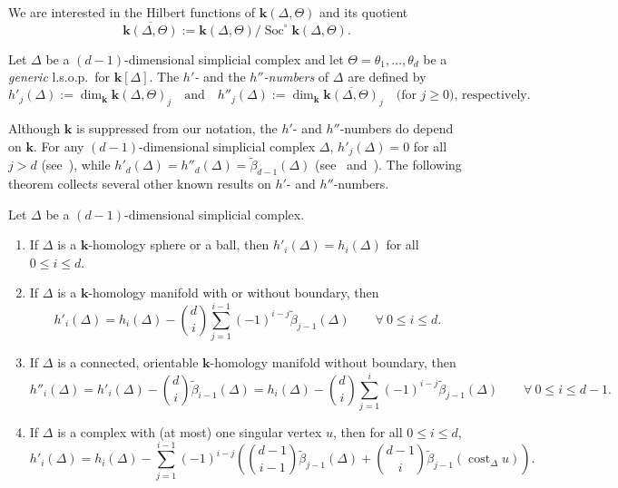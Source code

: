 \documentclass[ALCO,ThmDefs,Unicode,epreuves]{cedram}
\DeclareMathOperator\cost{cost}
\DeclareMathOperator{\Soc}{Soc}
\newcommand{\field}{\mathbf{k}}
\begin{document}
We are interested in the Hilbert functions of $\field(\Delta,\Theta)$ and its quotient \[\overline{\field(\Delta,\Theta)}:= \field(\Delta,\Theta)/\Soc^\circ \field(\Delta,\Theta).\] 
\begin{defi} \label{def-h'-h''}
Let $\Delta$ be a $(d-1)$-dimensional simplicial complex and let $\Theta=\theta_1,\ldots,\theta_d$ be a \emph{generic} l.s.o.p.~for $\field[\Delta]$. The \emph{$h'$-} and the \emph{$h''$-numbers} of $\Delta$ are defined by
\[
h'_j(\Delta):=\dim_\field \field(\Delta,\Theta)_j \quad \mbox{and} \quad h''_j(\Delta):=\dim_\field \overline{\field(\Delta,\Theta)}_j \quad \mbox{(for $j\geq 0$), respectively.}
\]
\end{defi} 

Although $\field$ is suppressed from our notation, the $h'$- and $h''$-numbers do depend on $\field$. For any $(d-1)$-dimensional simplicial complex $\Delta$, $h'_j(\Delta)=0$ for all $j>d$ (see~\cite[Proposition~III.2.4(b)]{Stanley-96}), while $h'_d(\Delta)=h''_d(\Delta)=\tilde{\beta}_{d-1}(\Delta)$ (see~\cite[Theorem~4.1]{TayWhiteley} and~\cite[Lemma~2.2(3)]{Babson-Novik}). The following theorem collects several other known results on $h'$- and $h''$-numbers.

\goodbreak
\begin{theorem} \label{known-h'-h''} Let $\Delta$ be a $(d-1)$-dimensional simplicial complex.
\begin{enumerate}
\item\label{theo2.2_1} If $\Delta$ is a $\field$-homology sphere or a ball, then $h'_i(\Delta)=h_i(\Delta)$ for all $0\leq i\leq d$.
\item\label{theo2.2_2} If $\Delta$ is a $\field$-homology manifold with or without boundary, then 
\[h'_i(\Delta)=h_i(\Delta)-\binom{d}{i}\sum_{j=1}^{i-1}(-1)^{i-j}\tilde{\beta}_{j-1}(\Delta) \qquad \forall ~0\leq i\leq d.\]
\item\label{theo2.2_3} If $\Delta$ is a connected, orientable $\field$-homology manifold without boundary, then 
\[h''_i(\Delta)=h'_i(\Delta)-\binom{d}{i}\tilde{\beta}_{i-1}(\Delta)=
 h_i(\Delta)-\binom{d}{i}\sum_{j=1}^{i}(-1)^{i-j}\tilde{\beta}_{j-1}(\Delta) \qquad \forall ~ 0\leq i\leq d-1.\]
\item\label{theo2.2_4} If $\Delta$ is a complex with (at most) one singular vertex $u$, then for all $0\leq i\leq d$,
\[h'_i(\Delta)=h_i(\Delta)-\sum_{j=1}^{i-1}(-1)^{i-j}\left(\binom{d-1}{i-1}\tilde{\beta}_{j-1}(\Delta)+\binom{d-1}{i}\tilde{\beta}_{j-1}(\cost_{\Delta}u)\right).\]
\end{enumerate}
\end{theorem}
\end{document}
